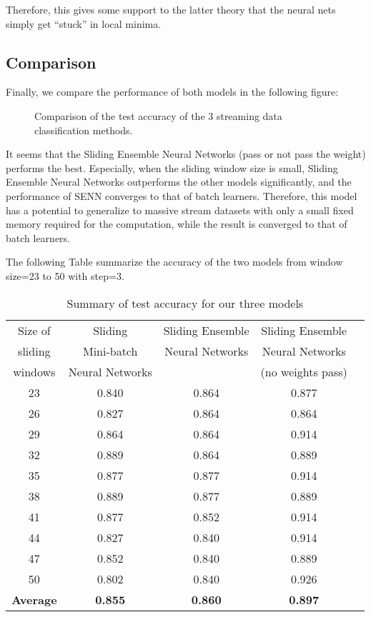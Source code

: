 \documentclass[conference]{IEEEtran}
\begin{document}
		Therefore, this gives some support to the latter theory that the neural nets simply get ``stuck'' in local minima.
		
		\subsection{Comparison} 
		
		Finally, we compare the performance of both models in the following figure:
		\begin{figure}[H]
			\centering
			\caption{Comparison of the test accuracy of the 3 streaming data classification methods.}
			\label{fig:results-trees-ensemble}
		\end{figure}
		It seems that the Sliding Ensemble Neural Networks (pass or not pass the weight) performs the best. Especially, when the sliding window size is small, Sliding Ensemble Neural Networks outperforms  the other models significantly, and the performance of SENN converges to that of batch learners. Therefore, this model has a potential to generalize to massive stream datasets with only a small fixed memory required for the computation, while the result is converged to that of batch learners.
		
		The following Table summarize the accuracy of the two models from window size=23 to 50 with step=3.
		\begin{table}[H]
			\centering
			\begin{tabular}{ccccc}
				\hline
				Size of&  Sliding& Sliding Ensemble& Sliding Ensemble\\
				sliding&  Mini-batch& Neural Networks& Neural Networks\\
				windows&  Neural Networks& & (no weights pass)\\
				\hline
				23 &  0.840 & 0.864 & 0.877 \\ 
				26 &  0.827 & 0.864 & 0.864 \\ 
				29 &  0.864 & 0.864 & 0.914 \\ 
				32 &  0.889 & 0.864 & 0.889 \\ 
				35 &  0.877 & 0.877 & 0.914 \\ 
				38 &  0.889 & 0.877 & 0.889 \\ 
				41 &  0.877 & 0.852 & 0.914 \\ 
				44 &  0.827 & 0.840 & 0.914 \\ 
				47 &  0.852 & 0.840 & 0.889 \\ 
				50 &  0.802 & 0.840 & 0.926 \\ 
				\hline
				\textbf{Average} & \textbf{0.855} &\textbf{0.860} &\textbf{0.897} \\
				\hline
			\end{tabular}
			\caption{Summary of test accuracy for our three models}
		\end{table}
		
\end{document}
